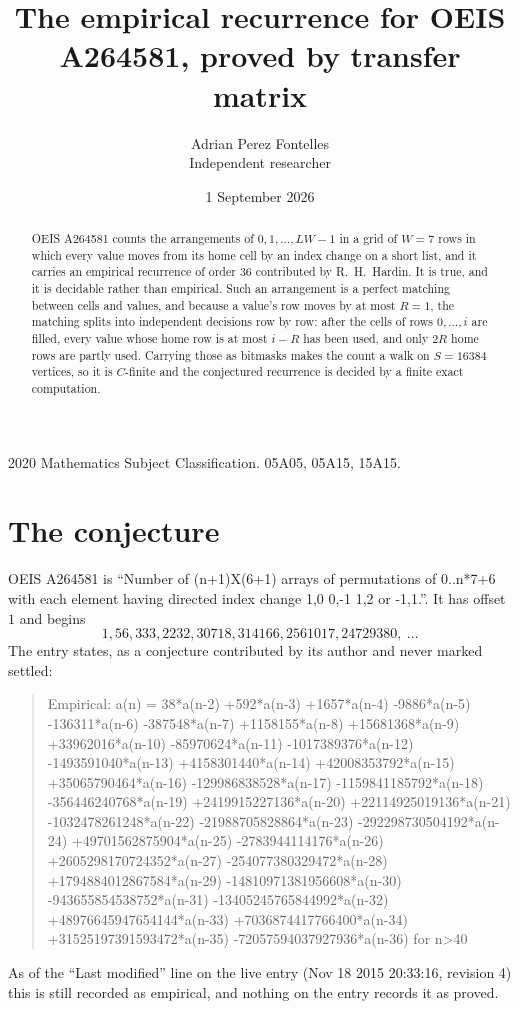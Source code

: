 \documentclass[11pt,a4paper]{article}
\title{The empirical recurrence for OEIS A264581, proved by transfer matrix}
\author{Adrian Perez Fontelles\\ \small Independent researcher}
\date{1 September 2026}
\theoremstyle{plain}
\theoremstyle{definition}
\begin{document}
\maketitle

\begin{abstract}
OEIS A264581 counts the arrangements of $0,1,\dots,LW-1$ in a grid of $W=7$ rows in which
every value moves from its home cell by an index change on a short list, and it carries an
empirical recurrence of order $36$ contributed by R.~H.~Hardin. It is true, and it is
decidable rather than empirical. Such an arrangement is a perfect matching between cells and
values, and because a value's row moves by at most $R=1$, the matching splits into
independent decisions row by row: after the cells of rows $0,\dots,i$ are filled,
every value whose home row is at most $i-R$ has been used, and only $2R$ home rows are
partly used. Carrying those as bitmasks makes the count a walk on $S=16384$ vertices, so it is
$C$-finite and the conjectured recurrence is decided by a finite exact computation.
\end{abstract}

\noindent\small 2020 Mathematics Subject Classification. 05A05, 05A15, 15A15.\normalsize

\section{The conjecture}

OEIS A264581 is ``Number of (n+1)X(6+1) arrays of permutations of 0..n*7+6 with each element having directed index change 1,0 0,-1 1,2 or -1,1.''. It has offset $1$ and begins
\[
1, 56, 333, 2232, 30718, 314166, 2561017, 24729380,\ \dots
\]
The entry states, as a conjecture contributed by its author and never marked settled:
\begin{quote}
Empirical: a(n) = 38*a(n-2) +592*a(n-3) +1657*a(n-4) -9886*a(n-5) -136311*a(n-6) -387548*a(n-7) +1158155*a(n-8) +15681368*a(n-9) +33962016*a(n-10) -85970624*a(n-11) -1017389376*a(n-12) -1493591040*a(n-13) +4158301440*a(n-14) +42008353792*a(n-15) +35065790464*a(n-16) -129986838528*a(n-17) -1159841185792*a(n-18) -356446240768*a(n-19) +2419915227136*a(n-20) +22114925019136*a(n-21) -1032478261248*a(n-22) -21988705828864*a(n-23) -292298730504192*a(n-24) +49701562875904*a(n-25) -2783944114176*a(n-26) +2605298170724352*a(n-27) -254077380329472*a(n-28) +1794884012867584*a(n-29) -14810971381956608*a(n-30) -943655854538752*a(n-31) -13405245765844992*a(n-32) +48976645947654144*a(n-33) +7036874417766400*a(n-34) +31525197391593472*a(n-35) -72057594037927936*a(n-36) for n>40
\end{quote}
As of the ``Last modified'' line on the live entry (Nov 18 2015 20:33:16, revision 4) this is still
recorded as empirical, and nothing on the entry records it as proved.
\end{document}
